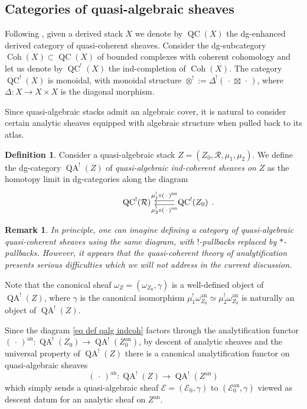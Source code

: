 \documentclass[11pt, a4paper]{amsart}
\numberwithin{equation}{section}
\newtheorem{remark}[theorem]{Remark}
\theoremstyle{definition}
\newtheorem{definition}[theorem]{Definition}
\theoremstyle{remark}
\DeclareMathOperator{\Coh}{Coh}
\DeclareMathOperator{\QC}{QC}
\DeclareMathOperator{\QA}{QA}
\newcommand{\Ee}{\mathcal{E}}
\newcommand{\Rr}{\mathcal{R}}
\renewcommand{\to}{\longrightarrow}
\begin{document}
\subsection{Categories of quasi-algebraic sheaves} 

Following \cite{BZSV}, given a derived stack $X$ we denote by $\QC(X)$ the dg-enhanced derived category of quasi-coherent sheaves. Consider the dg-subcategory $\Coh(X) \subset \QC(X)$ of bounded complexes with coherent cohomology and let us denote by $\QC^!(X)$ the ind-completion of $\Coh(X)$. The category $\QC^!(X)$ is monoidal, with monoidal structure $\otimes^!:= \Delta^!( \, \cdot \, \boxtimes \, \cdot \, )$, where $\Delta: X \to X \times X$ is the diagonal morphism.

Since quasi-algebraic stacks admit an algebraic cover, it is natural to consider certain analytic sheaves equipped with algebraic structure when pulled back to its atlas.

\begin{definition}
 Consider a quasi-algebraic stack $Z = (Z_0, \Rr, \mu_1, \mu_2)$. We define the dg-category $\QA^!(Z)$ of {\it quasi-algebraic ind-coherent sheaves on} $Z$ as the homotopy limit in dg-categories along the diagram
\begin{equation}
\label{eq def qalg indcoh}
\begin{tikzcd}
	{} & {\QC^!(\Rr)} & {\QC^!(Z_0)}
	\arrow["{\mu_2^! \circ ( \, \cdot \, )^{\mathrm{an}}}", shift left, from=1-3, to=1-2]
	\arrow["{\mu_1^!\circ ( \, \cdot \, )^{\mathrm{an}}}"', shift right, from=1-3, to=1-2]
\end{tikzcd}.
\end{equation}
\end{definition}

\begin{remark}
    In principle, one can imagine defining a category of quasi-algebraic quasi-coherent sheaves using the same diagram, with $!$-pullbacks replaced by $*$-pullbacks. However, it appears that the quasi-coherent theory of analytification presents serious difficulties which we will not address in the current discussion. 
\end{remark}

Note that the canonical sheaf $\omega_Z = (\omega_{Z_0}, \gamma)$ is a well-defined object of $\QA^!(Z)$, where $\gamma$ is the canonical isomorphism $\mu_1^! \omega_{Z_0}^{\mathrm{an}} \simeq \mu_2^!\omega_{Z_0}^{\mathrm{an}}$ is naturally an object of $\QA^!(Z)$.

Since the diagram \eqref{eq def qalg indcoh} factors through the analytification functor $( \, \cdot \, )^{\mathrm{an}}: \QA^!(Z_0) \to \QA^!(Z_0^{\mathrm{an}})$, by descent of analytic sheaves and the universal property of $\QA^!(Z)$ there is a canonical analytification functor on quasi-algebraic sheaves
\[
(\,  \cdot \, )^{\mathrm{an}}: \QA^!(Z) \to \QA^!(Z^{\mathrm{an}})
\]
which simply sends a quasi-algebraic sheaf $\Ee = (\Ee_0, \gamma)$ to $(\Ee_0^{\mathrm{an}}, \gamma)$ viewed as descent datum for an analytic sheaf on $Z^{\mathrm{an}}$.
\end{document}
